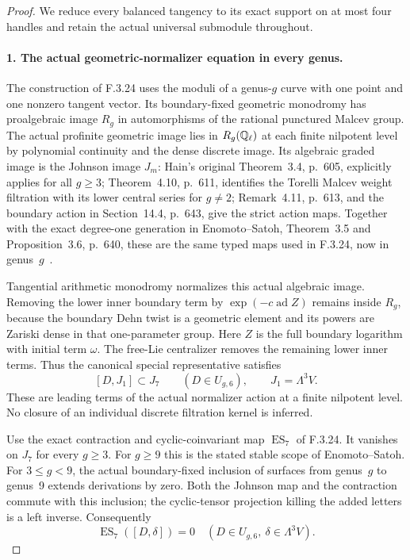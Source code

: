 \begin{proof}
We reduce every balanced tangency to its exact support on at most four handles and retain the actual universal submodule throughout.
\paragraph{1. The actual geometric-normalizer equation in every genus.}
The construction of F.3.24 uses the moduli of a genus-$g$
curve with one point and one nonzero tangent vector.
Its boundary-fixed geometric monodromy has proalgebraic
image $R_g$ in automorphisms of the rational punctured
Malcev group. The actual profinite geometric image lies
in $R_g(\mathbb Q_\ell)$ at each finite nilpotent level by
polynomial continuity and the dense discrete image.
Its algebraic graded image is the Johnson image $J_m$:
Hain's original Theorem~3.4, p.~605, explicitly applies
for all $g\geq3$; Theorem~4.10, p.~611, identifies
the Torelli Malcev weight filtration with its lower
central series for $g\ne2$; Remark~4.11, p.~613,
and the boundary action in Section~14.4, p.~643,
give the strict action maps. Together with the exact
degree-one generation in Enomoto--Satoh, Theorem~3.5
and Proposition~3.6, p.~640, these are the same
typed maps used in F.3.24, now in genus~$g$~\cite{AuditHain1997Torelli,AuditEnomotoSatoh2014}.

Tangential arithmetic monodromy normalizes this actual
algebraic image. Removing the lower inner boundary
term by $\exp(-c\operatorname{ad}Z)$ remains inside
$R_g$, because the boundary Dehn twist is a geometric
element and its powers are Zariski dense in that
one-parameter group. Here $Z$ is the full boundary
logarithm with initial term $\omega$. The free-Lie
centralizer removes the remaining lower inner terms.
Thus the canonical special representative satisfies
\[
       [D,J_1]\subset J_7\qquad(D\in U_{g,6}),
       \qquad J_1=\Lambda^3V.                              \tag{AG.2}
\]
These are leading terms of the actual normalizer
action at a finite nilpotent level. No closure of
an individual discrete filtration kernel is inferred.

Use the exact contraction and cyclic-coinvariant
map $\operatorname{ES}_7$ of F.3.24. It vanishes on
$J_7$ for every $g\geq3$. For $g\geq9$ this is
the stated stable scope of Enomoto--Satoh. For
$3\leq g<9$, the actual boundary-fixed inclusion
of surfaces from genus~$g$ to genus~9 extends
derivations by zero. Both the Johnson map and
the contraction commute with this inclusion;
the cyclic-tensor projection killing the added
letters is a left inverse. Consequently
\[
     \operatorname{ES}_7([D,\delta])=0
      \quad(D\in U_{g,6},\ \delta\in\Lambda^3V).           \tag{AG.3}
\]


\end{proof}
